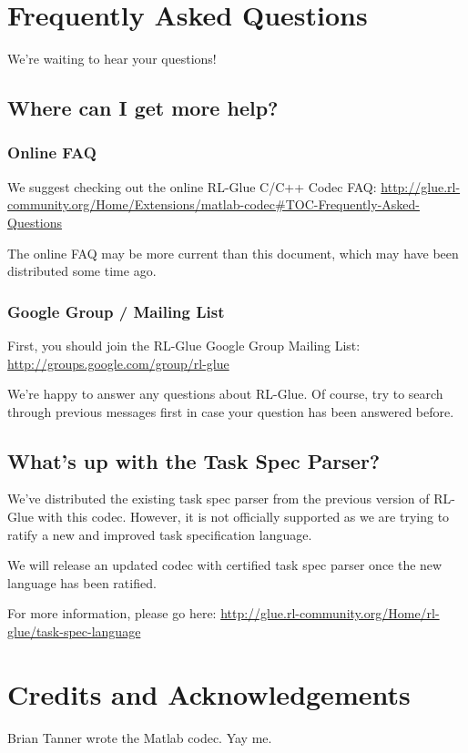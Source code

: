 \documentclass[11pt]{article}
\begin{document}
\section{Frequently Asked Questions}
We're waiting to hear your questions!

\subsection{Where can I get more help?}
\subsubsection{Online FAQ}
We suggest checking out the online RL-Glue C/C++ Codec FAQ:\newline
\url{http://glue.rl-community.org/Home/Extensions/matlab-codec#TOC-Frequently-Asked-Questions}

The online FAQ may be more current than this document, which may have been distributed some time ago.

\subsubsection{Google Group / Mailing List}
First, you should join the RL-Glue Google Group Mailing List:\newline
\url{http://groups.google.com/group/rl-glue}

We're happy to answer any questions about RL-Glue.  Of course, try to search through previous messages first in case your question has been answered before.


\subsection{What's up with the Task Spec Parser?}
We've distributed the existing task spec parser from the previous version of RL-Glue with this codec. 
However, it is not officially supported as we are trying to ratify a new and improved task 
specification language.

We will release an updated codec with certified task spec parser once the new language has been 
ratified.

For more information, please go here:\newline
\url{http://glue.rl-community.org/Home/rl-glue/task-spec-language}

\section{Credits and Acknowledgements}
Brian Tanner wrote the Matlab codec. Yay me.
\end{document}
